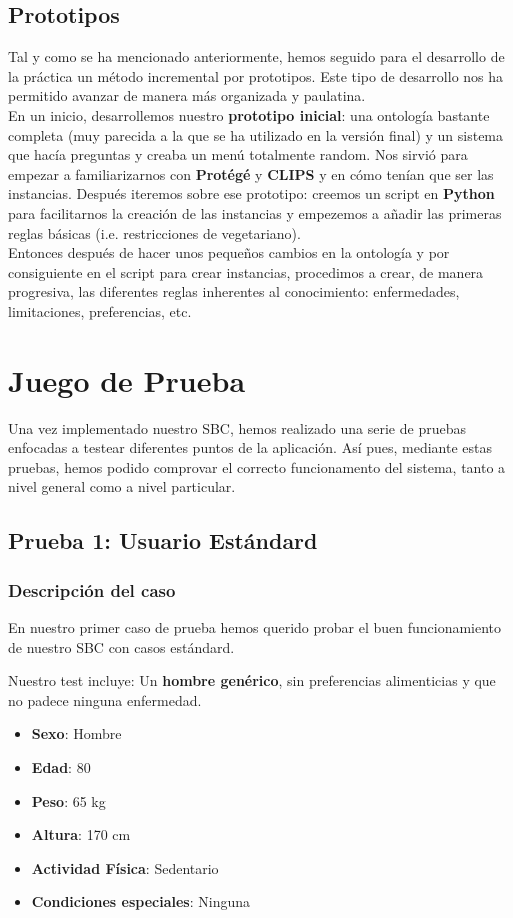 \documentclass[11]{article}
\begin{document}
\subsection{Prototipos}
Tal y como se ha mencionado anteriormente, hemos seguido para el desarrollo de la práctica un método incremental por prototipos. Este tipo de desarrollo nos ha permitido avanzar de manera más organizada y paulatina. 
\\
En un inicio, desarrollemos nuestro \textbf{prototipo inicial}: una ontología bastante completa (muy parecida a la que se ha utilizado en la versión final) y un sistema que hacía preguntas y creaba un menú totalmente random.  Nos sirvió para empezar a familiarizarnos con \textbf{Protégé} y \textbf{CLIPS} y en cómo tenían que ser las instancias. Después iteremos sobre ese prototipo: creemos un script en \textbf{Python} para facilitarnos la creación de las instancias y empezemos a añadir las primeras reglas básicas (i.e. restricciones de vegetariano). 
\\
Entonces después de hacer unos pequeños cambios en la ontología y por consiguiente en el script para crear instancias, procedimos a crear, de manera progresiva, las diferentes reglas inherentes al conocimiento: enfermedades, limitaciones, preferencias, etc.

\section{Juego de Prueba}
Una vez implementado nuestro SBC, hemos realizado una serie de pruebas enfocadas a testear diferentes puntos de la aplicación. Así pues, mediante estas pruebas, hemos podido comprovar el correcto funcionamento del sistema, tanto a nivel general como a nivel particular.

\subsection{Prueba 1: Usuario Estándard}
\subsubsection{Descripción del caso}
En nuestro primer caso de prueba hemos querido probar el buen funcionamiento de nuestro SBC con casos estándard. 
\medskip

Nuestro test incluye:
Un \textbf{hombre genérico}, sin preferencias alimenticias y que no padece ninguna enfermedad.

\begin{itemize}
\item \textbf{Sexo}: Hombre
\item \textbf{Edad}: 80
\item \textbf{Peso}: 65 kg
\item \textbf{Altura}: 170 cm
\item \textbf{Actividad Física}: Sedentario
\item \textbf{Condiciones especiales}: Ninguna
\end{itemize}
\end{document}
